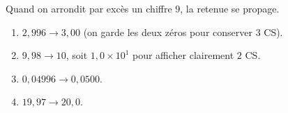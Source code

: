 \documentclass[11pt,a4paper]{article}
\begin{document}
\begin{corrige}
Quand on arrondit par excès un chiffre $9$, la retenue se propage.
\begin{enumerate}[label=\alph*)]
  \item $2,996 \to 3,00$ (on garde les deux zéros pour conserver $3$ CS).
  \item $9,98 \to 10$, soit $1,0\times10^{1}$ pour afficher clairement $2$ CS.
  \item $0,04996 \to 0,0500$.
  \item $19,97 \to 20,0$.
\end{enumerate}
\end{corrige}
\end{document}
